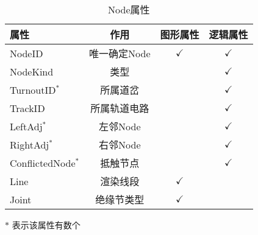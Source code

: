 \newcommand{\yes}{$\checkmark$}
\begin{table}[htpb!]
    \centering
    \caption{\label{node_prop}Node属性}
    \begin{threeparttable}
        \begin{tabular}{lccc}
            \toprule
            属性               & 作用         & 图形属性 & 逻辑属性 \\
            \midrule
            NodeID             & 唯一确定Node & \yes     & \yes     \\
            NodeKind           & 类型         &          & \yes     \\
            TurnoutID$^*$      & 所属道岔     &          & \yes     \\
            TrackID            & 所属轨道电路 &          & \yes     \\
            LeftAdj$^*$        & 左邻Node     &          & \yes     \\
            RightAdj$^*$       & 右邻Node     &          & \yes     \\
            ConflictedNode$^*$ & 抵触节点     &          & \yes     \\
            Line               & 渲染线段     & \yes     &          \\
            Joint              & 绝缘节类型   & \yes     &          \\
            \bottomrule
        \end{tabular}

        \begin{tablenotes}
            \footnotesize
            \item[$*$] 表示该属性有数个
        \end{tablenotes}
    \end{threeparttable}

\end{table}


